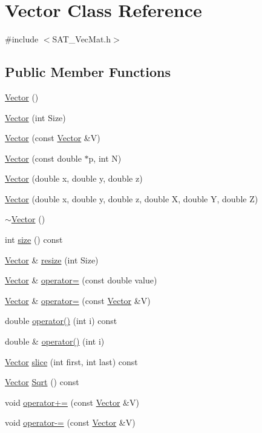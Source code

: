 \hypertarget{classVector}{\section{Vector Class Reference}
\label{classVector}
}


{\ttfamily \#include $<$S\-A\-T\-\_\-\-Vec\-Mat.\-h$>$}

\subsection*{Public Member Functions}
\begin{DoxyCompactItemize}
\item 
\hyperlink{classVector_a6f80c73b5f18dcf3f8e36065bdc8b9e5}{Vector} ()
\item 
\hyperlink{classVector_a1d51dc924ac77ec1b2e6853e6d86b946}{Vector} (int Size)
\item 
\hyperlink{classVector_af9eb9efae1dd9ad3d3b3a90800b9f285}{Vector} (const \hyperlink{classVector}{Vector} \&V)
\item 
\hyperlink{classVector_ab6ed0b8d7e69065e479778fdd6049af4}{Vector} (const double $\ast$p, int N)
\item 
\hyperlink{classVector_a70942524e217c2c27fc8e7d0925e6f72}{Vector} (double x, double y, double z)
\item 
\hyperlink{classVector_a4e2557e1c45f2f415f325446ac27910b}{Vector} (double x, double y, double z, double X, double Y, double Z)
\item 
\hyperlink{classVector_a2eb3c49587a4f12cade7895ccb73f6a0}{$\sim$\-Vector} ()
\item 
int \hyperlink{classVector_a3c8f59182463d6da833e7856f06e6171}{size} () const 
\item 
\hyperlink{classVector}{Vector} \& \hyperlink{classVector_ae803e925054a0a8f37704e3f4f9c6e30}{resize} (int Size)
\item 
\hyperlink{classVector}{Vector} \& \hyperlink{classVector_a89e5c222ff01b4452f23b4d18876145e}{operator=} (const double value)
\item 
\hyperlink{classVector}{Vector} \& \hyperlink{classVector_a27faac368a6e4f8ad88610a51966e1c6}{operator=} (const \hyperlink{classVector}{Vector} \&V)
\item 
double \hyperlink{classVector_aff71f22a0f26e5ac7ed19df67a1536ff}{operator()} (int i) const 
\item 
double \& \hyperlink{classVector_aa4176500b3557fab50489eff81fc4518}{operator()} (int i)
\item 
\hyperlink{classVector}{Vector} \hyperlink{classVector_ae58ec75ebd2a2d60775c2e0ee98a35ae}{slice} (int first, int last) const 
\item 
\hyperlink{classVector}{Vector} \hyperlink{classVector_aa803f912416c94f62e128dd64f30ba5f}{Sqrt} () const 
\item 
void \hyperlink{classVector_a5920d609be1cff526db95a6b76fabe70}{operator+=} (const \hyperlink{classVector}{Vector} \&V)
\item 
void \hyperlink{classVector_a74021a6a769cc68acdec2e78f0c1abfa}{operator-\/=} (const \hyperlink{classVector}{Vector} \&V)
\end{DoxyCompactItemize}
